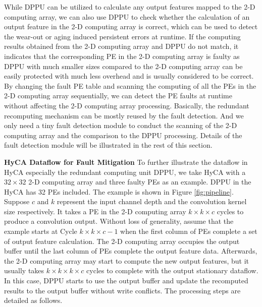 While DPPU can be utilized to calculate any output features mapped to the 2-D computing array, we can also use DPPU to check whether the calculation of an output feature in the 2-D computing array is correct, which can be used to detect the wear-out or aging induced persistent errors at runtime. If the computing results obtained from the 2-D computing array and DPPU do not match, it indicates that the corresponding PE in the 2-D computing array is faulty as DPPU with much smaller sizes compared to the 2-D computing array can be easily protected with much less overhead and is usually considered to be correct. By changing the fault PE table and scanning the computing of all the PEs in the 2-D computing array sequentially, we can detect the PE faults at runtime without affecting the 2-D computing array processing. Basically, the redundant recomputing mechanism can be mostly reused by the fault detection. And we only need a tiny fault detection module to conduct the scanning of the 2-D computing array and the comparison to the DPPU processing. Details of the fault detection module will be illustrated in the rest of this section.

\textbf{HyCA Dataflow for Fault Mitigation}\label{sec:dataflow}
To further illustrate the dataflow in HyCA especially the redundant computing unit DPPU, we take HyCA with a $32 \times 32$ 2-D computing array and three faulty PEs as an example. DPPU in the HyCA has 32 PEs included. The example is shown in Figure \ref{fig:pipeline}. Suppose $c$ and $k$ represent the input channel depth and the convolution kernel size respectively. It takes a PE in the 2-D computing array $k \times k \times c$ cycles to produce a convolution output. Without loss of generality, assume that the example starts at Cycle $k \times k \times c - 1$ when the first column of PEs complete a set of output feature calculation. The 2-D computing array occupies the output buffer until the last column of PEs complete the output feature data. Afterwards, the 2-D computing array may start to compute the new output features, but it usually takes $k \times k \times k \times c$ cycles to complete with the output stationary dataflow. In this case, DPPU starts to use the output buffer and update the recomputed results to the output buffer without write conflicts. The processing steps are detailed as follows.

